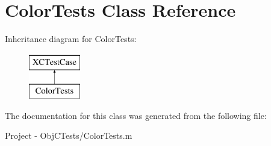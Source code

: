 \hypertarget{interface_color_tests}{}\section{Color\+Tests Class Reference}
\label{interface_color_tests}
Inheritance diagram for Color\+Tests\+:\begin{figure}[H]
\begin{center}
\leavevmode
\includegraphics[height=2.000000cm]{interface_color_tests}
\end{center}
\end{figure}


The documentation for this class was generated from the following file\+:\begin{DoxyCompactItemize}
\item 
Project -\/ Obj\+C\+Tests/Color\+Tests.\+m\end{DoxyCompactItemize}
